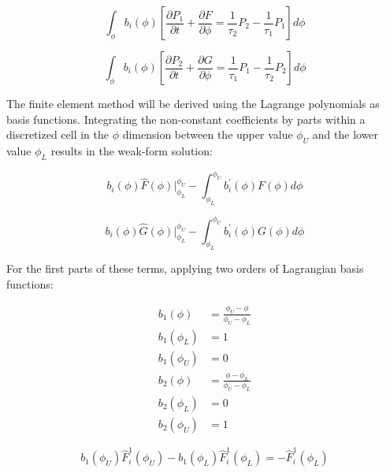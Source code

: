 \documentclass[12pt,a4paper,pagesize=pdftex]{scrartcl}
\begin{document}
\begin{equation*}
    \int_\phi b_i\left(\phi\right)\left[ \frac{\partial P_1}{\partial t} + \frac{\partial F}{\partial \phi} = \frac{1}{\tau_2} P_2 - \frac{1}{\tau_1} P_1\right] d\phi
\end{equation*}

\begin{equation*}
    \int_\phi b_i\left(\phi\right) \left[\frac{\partial P_2}{\partial t} + \frac{\partial G}{\partial \phi} = \frac{1}{\tau_1} P_1 - \frac{1}{\tau_2} P_2 \right] d\phi
\end{equation*}

The finite element method will be derived using the Lagrange polynomials as basis functions. Integrating the non-constant coefficients by parts within a discretized cell in the \(\phi\) dimension between the upper value \(\phi_U\) and the lower value \(\phi_L\) results in the weak-form solution:

\begin{equation*}
    b_i\left(\phi\right) \hat{F}\left(\phi\right) |_{\phi_L}^{\phi_U} - \int_{\phi_L}^{\phi_U} b_i^\prime\left(\phi\right) F\left(\phi\right) d\phi
\end{equation*}

\begin{equation*}
    b_i\left(\phi\right) \hat{G}\left(\phi\right) |_{\phi_L}^{\phi_U} - \int_{\phi_L}^{\phi_U} b_i^\prime\left(\phi\right) G\left(\phi\right) d\phi
\end{equation*}

For the first parts of these terms, applying two orders of Lagrangian basis functions:

\begin{align*}
    b_1\left(\phi\right) &= \frac{\phi_U - \phi}{\phi_U - \phi_L} \\
    b_1\left(\phi_L\right) &= 1 \\
    b_1\left(\phi_U\right) &= 0 \\
    b_2\left(\phi\right) &= \frac{\phi - \phi_L}{\phi_U - \phi_L} \\
    b_2\left(\phi_L\right) &= 0 \\
    b_2\left(\phi_U\right) &= 1
\end{align*}

\begin{equation*}
    b_1\left(\phi_U\right) \hat{F}^1_{i}\left(\phi_U\right) - b_1\left(\phi_L\right) \hat{F}^1_{i}\left(\phi_L\right) = - \hat{F}^1_{i}\left(\phi_L\right)
\end{equation*}
\end{document}
